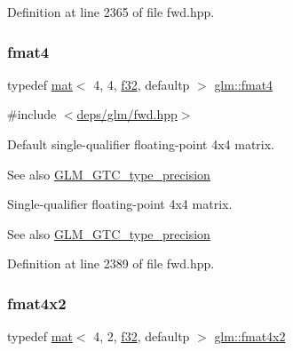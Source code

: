 Definition at line 2365 of file fwd.\+hpp.

\mbox{\label{group__gtc__type__precision_ga96345dda8e140bf8511b3e53128c0196}} 
\subsubsection{\texorpdfstring{fmat4}{fmat4}}
{\footnotesize\ttfamily typedef \hyperlink{structglm_1_1mat}{mat}$<$ 4, 4, \hyperlink{group__gtc__type__precision_ga0ec999b57f5330d9021256e96038df04}{f32}, defaultp $>$ \hyperlink{group__gtc__type__precision_ga96345dda8e140bf8511b3e53128c0196}{glm\+::fmat4}}



{\ttfamily \#include $<$\hyperlink{fwd_8hpp}{deps/glm/fwd.\+hpp}$>$}

Default single-\/qualifier floating-\/point 4x4 matrix. \begin{DoxySeeAlso}{See also}
\hyperlink{group__gtc__type__precision}{G\+L\+M\+\_\+\+G\+T\+C\+\_\+type\+\_\+precision}
\end{DoxySeeAlso}
Single-\/qualifier floating-\/point 4x4 matrix. \begin{DoxySeeAlso}{See also}
\hyperlink{group__gtc__type__precision}{G\+L\+M\+\_\+\+G\+T\+C\+\_\+type\+\_\+precision} 
\end{DoxySeeAlso}


Definition at line 2389 of file fwd.\+hpp.

\mbox{\label{group__gtc__type__precision_ga279cf309f0098c3d26ce88fe8a26375a}} 
\subsubsection{\texorpdfstring{fmat4x2}{fmat4x2}}
{\footnotesize\ttfamily typedef \hyperlink{structglm_1_1mat}{mat}$<$ 4, 2, \hyperlink{group__gtc__type__precision_ga0ec999b57f5330d9021256e96038df04}{f32}, defaultp $>$ \hyperlink{group__gtc__type__precision_ga279cf309f0098c3d26ce88fe8a26375a}{glm\+::fmat4x2}}



